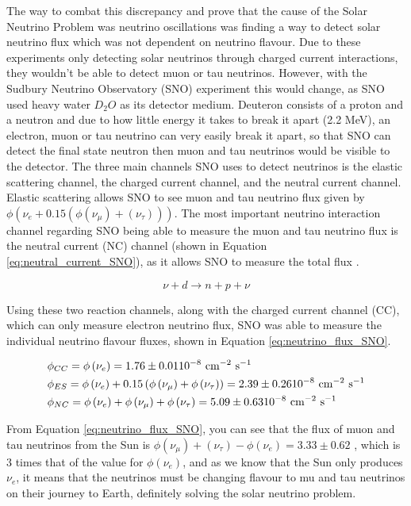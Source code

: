The way to combat this discrepancy and prove that the cause of the Solar Neutrino Problem was neutrino oscillations was finding a way to detect solar neutrino flux which was not dependent on neutrino flavour. Due to these experiments only detecting solar neutrinos through charged current interactions, they wouldn't be able to detect muon or tau neutrinos. However, with the Sudbury Neutrino Observatory (SNO) experiment this would change, as SNO used heavy water $D_{2}O$ as its detector medium. Deuteron consists of a proton and a neutron and due to how little energy it takes to break it apart (2.2 MeV), an electron, muon or tau neutrino can very easily break it apart, so that SNO can detect the final state neutron then muon and tau neutrinos would be visible to the detector. The three main channels SNO uses to detect neutrinos is the elastic scattering channel, the charged current channel, and the neutral current channel. Elastic scattering allows SNO to see muon and tau neutrino flux given by $\phi(\nu_{e} + 0.15(\phi(\nu_{\mu}) + (\nu_{\tau})))$. The most important neutrino interaction channel regarding SNO being able to measure the muon and tau neutrino flux is the neutral current (NC) channel (shown in Equation \ref{eq:neutral_current_SNO}), as it allows SNO to measure the total flux \cite{krastev2002global}.

\begin{equation}
    \nu + d \rightarrow n + p + \nu
\label{eq:neutral_current_SNO}
\end{equation}

Using these two reaction channels, along with the charged current channel (CC), which can only measure electron neutrino flux, SNO was able to measure the individual neutrino flavour fluxes, shown in Equation \ref{eq:neutrino_flux_SNO}. 


\begin{align}
&\phi_{C C}=\phi\left(\nu_{e}\right)=1.76 \pm 0.01 10^{-8} \mathrm{~cm}^{-2} \mathrm{~s}^{-1} \label{eq:neutrino_flux_SNO}\\
&\phi_{E S}=\phi\left(\nu_{e}\right)+0.15\left(\phi\left(\nu_{\mu}\right)+\phi\left(\nu_{\tau}\right)\right)=2.39 \pm 0.26 10^{-8} \mathrm{~cm}^{-2} \mathrm{~s}^{-1} \notag\\
&\phi_{N C}=\phi\left(\nu_{e}\right)+\phi\left(\nu_{\mu}\right)+\phi\left(\nu_{\tau}\right) = 5.09 \pm 0.63 10^{-8} \mathrm{~cm}^{-2} \mathrm{~s}^{-1} \notag
\end{align}


From Equation \ref{eq:neutrino_flux_SNO}, you can see that the flux of muon and tau neutrinos from the Sun is $\phi(\nu_{\mu}) + (\nu_{\tau}) - \phi(\nu_{e}) = 3.33 \pm 0.62$ , which is 3 times that of the value for $\phi(\nu_{e})$, and as we know that the Sun only produces $\nu_{e}$, it means that the neutrinos must be changing flavour to mu and tau neutrinos on their journey to Earth, definitely solving the solar neutrino problem. 


